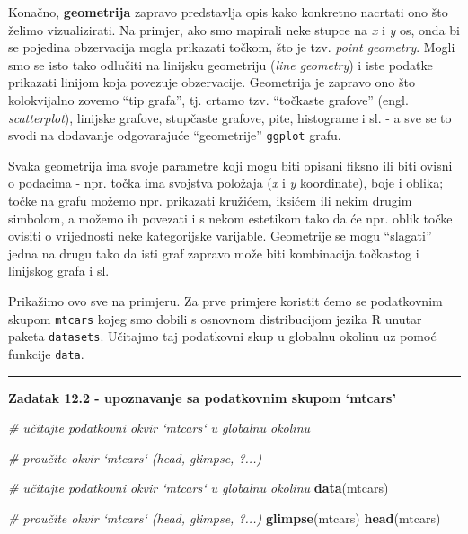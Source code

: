 \documentclass[]{book}
\newenvironment{Shaded}{\begin{snugshade}}{\end{snugshade}}
\newcommand{\KeywordTok}[1]{\textcolor[rgb]{0.13,0.29,0.53}{\textbf{#1}}}
\newcommand{\CommentTok}[1]{\textcolor[rgb]{0.56,0.35,0.01}{\textit{#1}}}
\newcommand{\NormalTok}[1]{#1}
\theoremstyle{definition}
\theoremstyle{definition}
\theoremstyle{definition}
\theoremstyle{remark}
\begin{document}
Konačno, \textbf{geometrija} zapravo predstavlja opis kako konkretno
nacrtati ono što želimo vizualizirati. Na primjer, ako smo mapirali neke
stupce na \emph{x} i \emph{y} os, onda bi se pojedina obzervacija mogla
prikazati točkom, što je tzv. \emph{point geometry}. Mogli smo se isto
tako odlučiti na linijsku geometriju (\emph{line geometry}) i iste
podatke prikazati linijom koja povezuje obzervacije. Geometrija je
zapravo ono što kolokvijalno zovemo ``tip grafa'', tj. crtamo tzv.
``točkaste grafove'' (engl. \emph{scatterplot}), linijske grafove,
stupčaste grafove, pite, histograme i sl. - a sve se to svodi na
dodavanje odgovarajuće ``geometrije'' \texttt{ggplot} grafu.

Svaka geometrija ima svoje parametre koji mogu biti opisani fiksno ili
biti ovisni o podacima - npr. točka ima svojstva položaja (\emph{x} i
\emph{y} koordinate), boje i oblika; točke na grafu možemo npr.
prikazati kružićem, iksićem ili nekim drugim simbolom, a možemo ih
povezati i s nekom estetikom tako da će npr. oblik točke ovisiti o
vrijednosti neke kategorijske varijable. Geometrije se mogu ``slagati''
jedna na drugu tako da isti graf zapravo može biti kombinacija točkastog
i linijskog grafa i sl.

Prikažimo ovo sve na primjeru. Za prve primjere koristit ćemo se
podatkovnim skupom \texttt{mtcars} kojeg smo dobili s osnovnom
distribucijom jezika R unutar paketa \texttt{datasets}. Učitajmo taj
podatkovni skup u globalnu okolinu uz pomoć funkcije \texttt{data}.

\begin{center}\rule{0.5\linewidth}{\linethickness}\end{center}

\textbf{Zadatak 12.2 - upoznavanje sa podatkovnim skupom `mtcars'}

\begin{Shaded}
\begin{Highlighting}[]
\CommentTok{# učitajte podatkovni okvir `mtcars` u globalnu okolinu}

\CommentTok{# proučite okvir `mtcars`  (head, glimpse, ?...)}
\end{Highlighting}
\end{Shaded}

\begin{Shaded}
\begin{Highlighting}[]
\CommentTok{# učitajte podatkovni okvir `mtcars` u globalnu okolinu}
\KeywordTok{data}\NormalTok{(mtcars)}

\CommentTok{# proučite okvir `mtcars`  (head, glimpse, ?...)}
\KeywordTok{glimpse}\NormalTok{(mtcars)}
\KeywordTok{head}\NormalTok{(mtcars)}
\end{Highlighting}
\end{Shaded}
\end{document}
